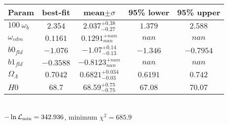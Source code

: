 \begin{tabular}{|l|c|c|c|c|} 
 \hline 
Param & best-fit & mean$\pm\sigma$ & 95\% lower & 95\% upper \\ \hline 
$100~\omega_{b }$ &$2.354$ & $2.037_{-0.27}^{+0.38}$ & $1.379$ & $2.588$ \\ 
$\omega_{cdm }$ &$0.1161$ & $0.1291_{nan}^{+nan}$ & $nan$ & $nan$ \\ 
$b0_{fld }$ &$-1.076$ & $-1.07_{-0.13}^{+0.14}$ & $-1.346$ & $-0.7954$ \\ 
$b1_{fld }$ &$-0.3588$ & $-0.8123_{nan}^{+nan}$ & $nan$ & $nan$ \\ 
$\Omega_{\Lambda }$ &$0.7042$ & $0.6821_{-0.03}^{+0.034}$ & $0.6191$ & $0.742$ \\ 
$H0$ &$68.7$ & $68.59_{-0.75}^{+0.75}$ & $67.08$ & $70.07$ \\ 
\hline 
 \end{tabular} \\ 
$-\ln{\cal L}_\mathrm{min} =342.936$, minimum $\chi^2=685.9$ \\ 
